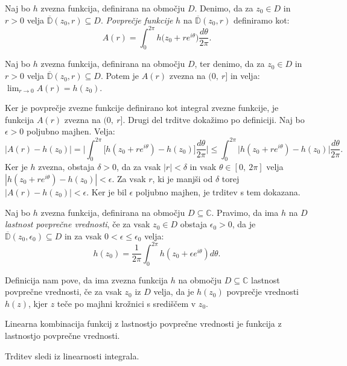 \documentclass[mat1]{fmfdelo}
\newcommand{\C}{\mathbb C}
\begin{document}
    \begin{definicija}  
        Naj bo $h$ zvezna funkcija, definirana na območju $D$. Denimo, da za $z_0 \in D$ in $r > 0$ velja $\overline{\mathbb{D}}(z_0, r) \subseteq D$. \emph{Povprečje funkcije} $h$ na $\overline{\mathbb{D}}(z_0, r)$ definiramo kot:
        $$
            A(r) = \int_{0}^{2 \pi}{h \big(z_0 + r e^{i\theta}\big)\frac{d\theta}{2 \pi}}.
        $$
    \end{definicija}
    \begin{trditev}
        \label{zvpov}
        Naj bo $h$ zvezna funkcija, definirana na območju $D$, ter denimo, da za $z_0 \in D$ in $r > 0$ velja $\overline{\mathbb{D}}(z_0, r) \subseteq D$. 
        Potem je $A(r)$ zvezna na $(0,~r]$ in velja: $\lim_{r \to 0}{A(r)} = h(z_0)$.
    \end{trditev}
    \begin{dokaz}
        Ker je povprečje zvezne funkcije definirano kot integral zvezne funkcije, je funkcija $A(r)$ zvezna na $(0,~r]$. Drugi del trditve dokažimo po definiciji.
        Naj bo $\epsilon > 0$ poljubno majhen. Velja:
        $$
            |A(r) - h(z_0)| = \bigg|\int_{0}^{2\pi} \big[h(z_0 + r e^{i\theta})  - h(z_0)\big] \frac{d\theta}{2\pi} \bigg| \leq \int_{0}^{2 \pi} \big| h(z_0 + r e^{i\theta}) - h(z_0) \big| \frac{d\theta}{2 \pi}.
        $$
        Ker je $h$ zvezna, obstaja $\delta > 0$, da za vsak $|r| < \delta$ in vsak $\theta \in [0,~2\pi]$ velja \mbox{$|h(z_0 + r e^{i\theta}) - h(z_0)| < \epsilon$}.
        Za vsak $r$, ki je manjši od $\delta$ torej $|A(r) - h(z_0)| < \epsilon$. Ker je bil $\epsilon$ poljubno majhen, je trditev s tem dokazana.
    \end{dokaz}

    \begin{definicija}
        Naj bo $h$ zvezna funkcija, definirana na območju $D \subseteq \C$. Pravimo, da ima $h$ na $D$ \emph{lastnost povprečne vrednosti}, če za vsak $z_0 \in D$ obstaja $\epsilon_0 > 0$, da je $\overline{\mathbb{D}}(z_0, \epsilon_0) \subseteq D$ in za vsak $0 < \epsilon \leq \epsilon_0 $ velja:
        $$
            h(z_0) = \frac{1}{2 \pi} \int_{0}^{2 \pi}{h(z_0 + \epsilon e^{i \theta}) d\theta}.
        $$
    \end{definicija}
    \begin{opomba}
        Definicija nam pove, da ima zvezna funkcija $h$ na območju $D \subseteq \C$ lastnost povprečne vrednosti, če za vsak $z_0$ iz $D$ velja, 
        da je $h(z_0)$ povprečje vrednosti $h(z)$, kjer $z$ teče po majhni krožnici s središčem v $z_0$.
    \end{opomba}
    \begin{trditev}
        \label{linlpv}
        Linearna kombinacija funkcij z lastnostjo povprečne vrednosti je funkcija z lastnostjo povprečne vrednosti. 
    \end{trditev}
    \begin{dokaz}
        Trditev sledi iz linearnosti integrala.
    \end{dokaz}
\end{document}
